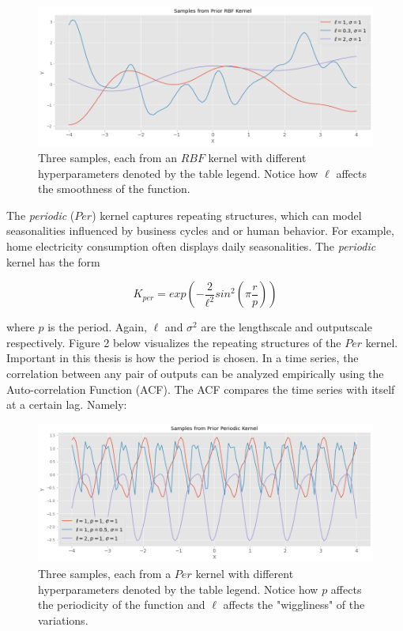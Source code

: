 \begin{figure}[htp]
\centering
\graphicspath{ {./images/} }
\includegraphics[scale=0.49]{images/samples_rbf_prior.png}
\caption{Three samples, each from an $RBF$ kernel with different hyperparameters denoted by the table legend. Notice how $\ell$ affects the smoothness of the function.}
\end{figure}

The \textit{periodic} ($Per$) kernel captures repeating structures, which can model seasonalities influenced by business cycles and or human behavior. For example, home electricity consumption often displays daily seasonalities. The \textit{periodic} kernel has the form

$$K_{per} = exp(-\frac{2}{\ell^2} sin^2 (\pi \frac{r}{p}))$$

where $p$ is the period. Again, $\ell$ and $\sigma^2$ are the lengthscale and outputscale respectively. Figure 2 below visualizes the repeating structures of the $Per$ kernel. Important in this thesis is how the period is chosen. In a time series, the correlation between any pair of outputs can be analyzed empirically using the Auto-correlation Function (ACF). The ACF compares the time series with itself at a certain lag. Namely:

\begin{figure}[htp]
\centering
\graphicspath{ {./images/} }
\includegraphics[scale=0.49]{images/samples_periodic_prior.png}
\caption{Three samples, each from a $Per$ kernel with different hyperparameters denoted by the table legend. Notice how $p$ affects the periodicity of the function and $\ell$ affects the "wiggliness" of the variations.}
\end{figure}

